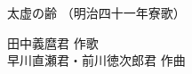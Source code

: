 \documentclass[10pt,b5j]{tarticle} %
\begin{document}
\begin{minipage}[c]{0.7\hsize} %
    \begin{center}
        {\LARGE
            太虚の齢 %
        }
        {\small 
            （明治四十一年寮歌） %
        }
    \end{center}
\end{minipage}
\begin{minipage}[c]{0.3\hsize} %
    \begin{flushright} %
        田中義麿君 作歌\\早川直瀬君・前川徳次郎君 作曲 %
    \end{flushright}
\end{minipage}
\end{document}

